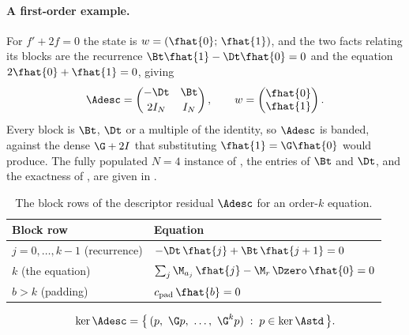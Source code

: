 \paragraph{A first-order example.}
For $f' + 2f = 0$ the state is $w = (\fhat{0};\, \fhat{1})$, and the two facts relating its blocks are the recurrence $\Bt\fhat{1} - \Dt\fhat{0} = 0$ and the equation $2\fhat{0} + \fhat{1} = 0$, giving
\begin{equation}
    \Adesc =
    \begin{pmatrix}
        -\Dt & \Bt \\[2pt]
        2 I_N & I_N
    \end{pmatrix},
    \qquad w = \begin{pmatrix} \fhat{0} \\ \fhat{1} \end{pmatrix} .
    \label{eq:descriptor-first-order}
\end{equation}
Every block is $\Bt$, $\Dt$ or a multiple of the identity, so $\Adesc$ is banded, against the dense $\G + 2I$ that substituting $\fhat{1} = \G \fhat{0}$ would produce. The fully populated $N = 4$ instance of , the entries of $\Bt$ and $\Dt$, and the exactness of , are given in .

\begin{table}[htbp]
    \centering
    \caption{The block rows of the descriptor residual $\Adesc$ for an order-$k$ equation.}
    \label{tab:descriptor-rows}
    \small
    \begin{tabular}{@{}l l@{}}
        \toprule
        Block row & Equation \\
        \midrule
        $j = 0, \dots, k-1$ (recurrence) & $-\Dt\,\fhat{j} + \Bt\,\fhat{j+1} = 0$ \\
        $k$ (the equation) & $\sum_{j} \M_{a_j}\,\fhat{j} - \M_r\,\Dzero\,\fhat{0} = 0$ \\
        $b > k$ (padding) & $c_{\mathrm{pad}}\,\fhat{b} = 0$ \\
        \bottomrule
    \end{tabular}
\end{table}

\begin{theorem}
\label{thm:kernel-equivalence}
\begin{equation}
    \ker \Adesc = \bigl\{\, (p,\ \G p,\ \dots,\ \G^{k} p) \;:\; p \in \ker \Astd \,\bigr\} .
    \label{eq:kernel-equivalence}
\end{equation}
\end{theorem}

